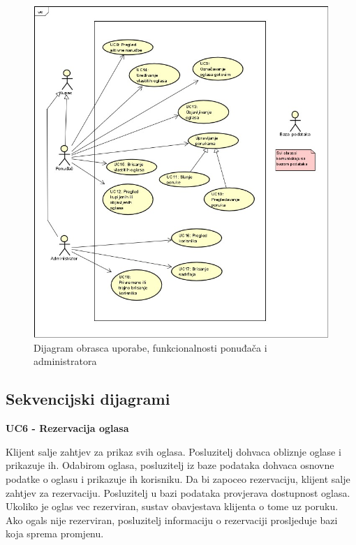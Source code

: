 				
					\begin{figure}[H]
						\includegraphics[scale=1]{dijagrami/DijagramOU2.PNG} %
						\centering
						\caption{ Dijagram obrasca uporabe, funkcionalnosti ponuđača i administratora}
						\label{fig:dijagram2}
					\end{figure}
				\eject		
				
			\subsection{Sekvencijski dijagrami}
				
				\textbf{UC6 - Rezervacija oglasa}

				Klijent salje zahtjev za prikaz svih oglasa. Posluzitelj dohvaca obliznje oglase i prikazuje ih. Odabirom oglasa,  posluzitelj iz baze podataka dohvaca osnovne podatke o oglasu i prikazuje ih korisniku. Da bi zapoceo rezervaciju, klijent salje zahtjev za rezervaciju. Posluzitelj u bazi podataka provjerava dostupnost oglasa. Ukoliko je oglas vec rezerviran, sustav obavjestava klijenta o tome uz poruku. Ako ogals nije rezerviran, posluzitelj informaciju o rezervaciji prosljeduje bazi koja sprema promjenu.
				
